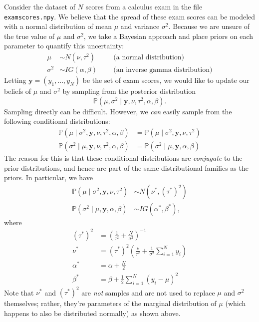 Consider the dataset of $N$ scores from a calculus exam in the file \texttt{examscores.npy}.
We believe that the spread of these exam scores can be modeled with a normal distribution of mean $\mu$ and variance $\sigma^{2}$.
Because we are unsure of the true value of $\mu$ and $\sigma^2$, we take a Bayesian approach and place priors on each parameter to quantify this uncertainty:
\begin{align*}
\mu & \sim N(\nu, \tau^{2})\quad &&\text{(a normal distribution)} \\
\sigma^{2} & \sim IG(\alpha, \beta) &&\text{(an inverse gamma distribution)}
\end{align*}
Letting $\mathbf{y} = (y_1,\ldots,y_N)$ be the set of exam scores, we would like to update our beliefs of $\mu$ and $\sigma^2$ by sampling from the posterior
distribution
\begin{equation*}
\mathbb{P}(\mu, \sigma^{2} \mid \mathbf{y}, \nu, \tau^{2}, \alpha, \beta).
\end{equation*}
Sampling directly can be difficult. However, we \emph{can} easily sample from the following conditional distributions:
\begin{align*}
\mathbb{P}(\mu \mid \sigma^{2}, \mathbf{y}, \nu, \tau^{2}, \alpha, \beta) & = \mathbb{P}(\mu \mid \sigma^{2}, \mathbf{y}, \nu, \tau^{2})\\
\mathbb{P}(\sigma^{2} \mid \mu, \mathbf{y}, \nu, \tau^{2}, \alpha, \beta) & = \mathbb{P}(\sigma^{2} \mid \mu, \mathbf{y}, \alpha, \beta)
\end{align*}
The reason for this is that these conditional distributions are \emph{conjugate} to the prior distributions, and hence are part of the same distributional
families as the priors. In particular, we have
\begin{align*}
\mathbb{P}(\mu \mid \sigma^{2}, \mathbf{y}, \nu, \tau^{2}) &\sim N(\nu^*, (\tau^*)^2)\\
\mathbb{P}(\sigma^{2} \mid \mu, \mathbf{y}, \alpha, \beta) &\sim IG(\alpha^*, \beta^*),
\end{align*}
where
\begin{align*}
(\tau^*)^2 &= \left(\frac{1}{\tau^2}+\frac{N}{\sigma^2}\right)^{-1}\\
\nu^* &= (\tau^*)^2\left(\frac{\nu}{\tau^2} + \frac{1}{\sigma^2}\sum_{i=1}^N y_i \right)\\
\alpha^* &= \alpha + \frac{N}{2}\\
\beta^* &= \beta + \frac{1}{2}\sum_{i=1}^N (y_i-\mu)^2
\end{align*}
Note that $\nu^*$ and $\left(\tau^*\right)^2$ are \emph{not} samples and are not used to replace $\mu$ and $\sigma^2$ themselves; rather, they're parameters of the marginal distribution of $\mu$ (which happens to also be distributed normally) as shown above.

